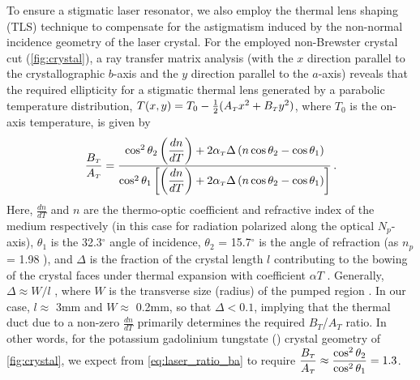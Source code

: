 To ensure a stigmatic laser resonator, we also employ the thermal lens shaping (TLS) technique \cite{Rimington_thermal_lens_2004} to compensate for the astigmatism induced by the non-normal incidence geometry of the laser crystal. 
For the employed non-Brewster crystal cut (\ref{fig:crystal}), a ray
transfer matrix analysis (with the $x$ direction parallel to the crystallographic $b$-axis and the $y$
direction parallel to the $a$-axis) reveals that the required ellipticity for a stigmatic thermal lens
generated by a parabolic temperature distribution, $T(x, y) = T_0 - \frac{1}{2} ( A_{{\scriptscriptstyle T}} x^2 + B_{{\scriptscriptstyle T}} y^2 )$, where $T_0$
is the on-axis temperature, is given by
\begin{equation} \label{eq:laser_ratio_ba}
  \frac{B_{{\scriptscriptstyle T}}}{A_{{\scriptscriptstyle T}}} = 
  \frac{ \cos^2 \theta_2 \left( \dfrac{dn}{dT} \right) + 2 \alpha_{{\scriptscriptstyle T}} \Delta \left( n \cos\theta_2 - \cos\theta_1 \right) }
       { \cos^2 \theta_1 \left[ \left( \dfrac{dn}{dT} \right) + 2 \alpha_{{\scriptscriptstyle T}} \Delta \left( n \cos\theta_2 - \cos\theta_1 \right) \right] } \,\text{.}
\end{equation}
Here, $\frac{dn}{dT}$ and $n$ are the thermo-optic coefficient and refractive index of the medium respectively (in this case for radiation polarized along the optical $N_p$-axis), $\theta_1$ is the 32.3$^\circ$ angle of incidence, $\theta_2$ = 15.7$^\circ$ is the angle of refraction (as $n_p$ = 1.98 \cite{Biswal_thermo_optical_05,pujol_crystalline_1999}), and $\Delta$ is the fraction of the crystal length $l$ contributing to the bowing of the crystal faces under thermal
expansion with coefficient $\alpha T$ \cite{Rimington_thermal_lens_2004}.
Generally, $\Delta \approx W / l$ , where $W$ is the transverse size (radius) of the pumped region \cite{Koechner_thermal_1970}.
In our case, $l \approx$ 3mm and $W \approx$ 0.2mm, so that $\Delta < 0.1$, implying that the thermal duct due to a non-zero $\frac{dn}{dT}$ primarily determines the required $B_T$/$A_T$ ratio.
In other words, for the potassium gadolinium tungstate () crystal geometry of \ref{fig:crystal}, we expect from \ref{eq:laser_ratio_ba} to require $\dfrac{B_{{\scriptscriptstyle T}}}{A_{{\scriptscriptstyle T}}} \approx \dfrac{ \cos^2 \theta_2 }{ \cos^2 \theta_1 } = 1.3$.

